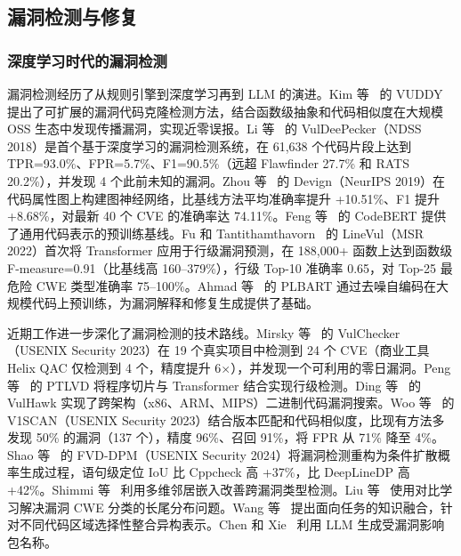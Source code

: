 \documentclass[11pt,a4paper,onecolumn]{article}
\begin{document}
\subsection{漏洞检测与修复}

\subsubsection{深度学习时代的漏洞检测}
漏洞检测经历了从规则引擎到深度学习再到 LLM 的演进。Kim 等~\cite{kim2017vuddy} 的 VUDDY 提出了可扩展的漏洞代码克隆检测方法，结合函数级抽象和代码相似度在大规模 OSS 生态中发现传播漏洞，实现近零误报。Li 等~\cite{li2018vuldeepecker} 的 VulDeePecker（NDSS 2018）是首个基于深度学习的漏洞检测系统，在 61,638 个代码片段上达到 TPR=93.0\%、FPR=5.7\%、F1=90.5\%（远超 Flawfinder 27.7\% 和 RATS 20.2\%），并发现 4 个此前未知的漏洞。Zhou 等~\cite{zhou2019devign} 的 Devign（NeurIPS 2019）在代码属性图上构建图神经网络，比基线方法平均准确率提升 +10.51\%、F1 提升 +8.68\%，对最新 40 个 CVE 的准确率达 74.11\%。Feng 等~\cite{feng2020codebert} 的 CodeBERT 提供了通用代码表示的预训练基线。Fu 和 Tantithamthavorn~\cite{fu2021linevul} 的 LineVul（MSR 2022）首次将 Transformer 应用于行级漏洞预测，在 188,000+ 函数上达到函数级 F-measure=0.91（比基线高 160--379\%），行级 Top-10 准确率 0.65，对 Top-25 最危险 CWE 类型准确率 75--100\%。Ahmad 等~\cite{ahmad2021plbart} 的 PLBART 通过去噪自编码在大规模代码上预训练，为漏洞解释和修复生成提供了基础。

近期工作进一步深化了漏洞检测的技术路线。Mirsky 等~\cite{mirsky2023vulchecker} 的 VulChecker（USENIX Security 2023）在 19 个真实项目中检测到 24 个 CVE（商业工具 Helix QAC 仅检测到 4 个，精度提升 6$\times$），并发现一个可利用的零日漏洞。Peng 等~\cite{peng2023ptlvd} 的 PTLVD 将程序切片与 Transformer 结合实现行级检测。Ding 等~\cite{ding2023vulhawk} 的 VulHawk 实现了跨架构（x86、ARM、MIPS）二进制代码漏洞搜索。Woo 等~\cite{woo2023v1scan} 的 V1SCAN（USENIX Security 2023）结合版本匹配和代码相似度，比现有方法多发现 50\% 的漏洞（137 个），精度 96\%、召回 91\%，将 FPR 从 71\% 降至 4\%。Shao 等~\cite{shao2024fvddpm} 的 FVD-DPM（USENIX Security 2024）将漏洞检测重构为条件扩散概率生成过程，语句级定位 IoU 比 Cppcheck 高 +37\%，比 DeepLineDP 高 +42\%。Shimmi 等~\cite{shimmi2024vulsim} 利用多维邻居嵌入改善跨漏洞类型检测。Liu 等~\cite{liu2024contrastive} 使用对比学习解决漏洞 CWE 分类的长尾分布问题。Wang 等~\cite{wang2024taskfusion} 提出面向任务的知识融合，针对不同代码区域选择性整合异构表示。Chen 和 Xie~\cite{chen2024vullibgen} 利用 LLM 生成受漏洞影响包名称。
\end{document}
